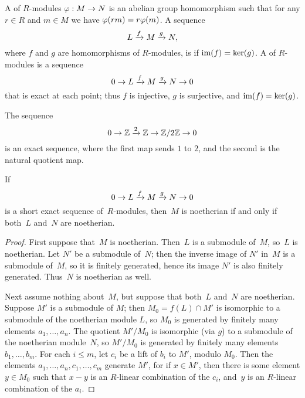 A  of $R$-modules $\varphi:M\to N$ is an abelian group
homomorphism such that for any $r\in R$ and $m\in M$ we have
$\varphi(rm) = r\varphi(m)$.  
A sequence 
$$
  L \xrightarrow{f} M \xrightarrow{g} N,
$$ where $f$ and $g$ are homomorphisms of $R$-modules,
is  if $\operatorname{im}(f)=\ker(g)$.
A  of $R$-modules is a sequence
$$0 \to L \xrightarrow{f} M \xrightarrow{g} N \to 0$$
that is exact at each point; thus
$f$ is injective, $g$ is surjective, and $\operatorname{im}(f) = \ker(g)$.

\begin{example}
The sequence
$$
  0 \to \mathbb{Z} \xrightarrow{2} \mathbb{Z}\rightarrow \mathbb{Z}/2\mathbb{Z} \to 0
$$ 
is an exact sequence, where the first map sends $1$ to $2$, and the second
is the natural quotient map.
\end{example}


\begin{lemma}\label{lem:noetherianexact}
If 
$$
 0 \to L \xrightarrow{f} M \xrightarrow{g} N \to 0
$$ 
is a short exact sequence of~$R$-modules, then~$M$ is noetherian if and 
only if both~$L$ and~$N$ are noetherian.
\end{lemma}
\begin{proof}
First suppose that~$M$ is noetherian.  Then~$L$ is a submodule of~$M$, so~$L$
is noetherian.  Let $N'$ be a submodule of~$N$; then the inverse image of $N'$
in~$M$ is a submodule of~$M$, so it is finitely generated, hence its image
$N'$ is also finitely generated.  Thus~$N$ is noetherian as well.

Next assume nothing about~$M$, but suppose that both~$L$ and~$N$ are
noetherian.  Suppose $M'$ is a submodule of $M$; then $M_0=f(L)\cap M'$
is isomorphic to a submodule of the noetherian module $L$, so $M_0$ is
generated by finitely many elements $a_1,\ldots, a_n$.  The quotient
$M'/M_0$ is isomorphic (via $g$) to a submodule of the noetherian
module~$N$, so $M'/M_0$ is generated by finitely many elements
$b_1,\ldots, b_m$. For each $i\leq m$, let $c_i$ be a lift of $b_i$ to
$M'$, modulo $M_0$.  Then the elements $a_1,\ldots, a_n, c_1,\ldots,
c_m$ generate $M'$, for if $x\in M'$, then there is some element $y\in
M_0$ such that $x-y$ is an $R$-linear combination of the $c_i$,
and~$y$ is an $R$-linear combination of the $a_i$.
\end{proof}



